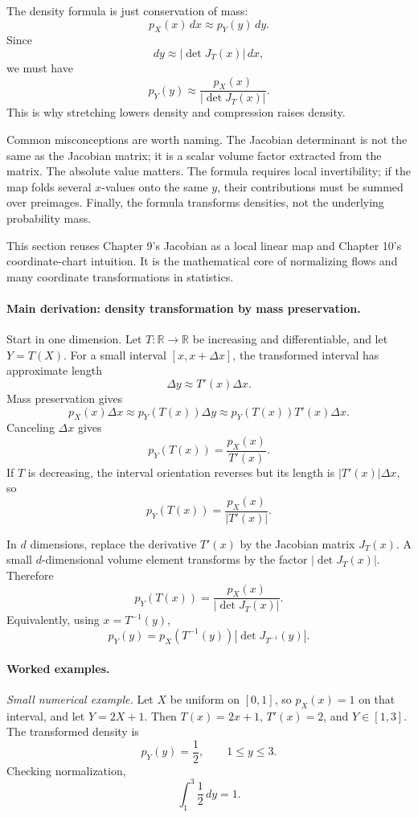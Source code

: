 The density formula is just conservation of mass:
\[
p_X(x)\,dx \approx p_Y(y)\,dy.
\]
Since
\[
dy\approx |\det J_T(x)|\,dx,
\]
we must have
\[
p_Y(y)\approx \frac{p_X(x)}{|\det J_T(x)|}.
\]
This is why stretching lowers density and compression raises density.

Common misconceptions are worth naming. The Jacobian determinant is not the same as the Jacobian matrix; it is a scalar volume factor extracted from the matrix. The absolute value matters. The formula requires local invertibility; if the map folds several \(x\)-values onto the same \(y\), their contributions must be summed over preimages. Finally, the formula transforms densities, not the underlying probability mass.

This section reuses Chapter 9's Jacobian as a local linear map and Chapter 10's coordinate-chart intuition. It is the mathematical core of normalizing flows and many coordinate transformations in statistics.

\paragraph{Main derivation: density transformation by mass preservation.}
Start in one dimension. Let \(T:\mathbb{R}\to\mathbb{R}\) be increasing and differentiable, and let \(Y=T(X)\). For a small interval \([x,x+\Delta x]\), the transformed interval has approximate length
\[
\Delta y\approx T'(x)\Delta x.
\]
Mass preservation gives
\[
p_X(x)\Delta x \approx p_Y(T(x))\Delta y
\approx p_Y(T(x))T'(x)\Delta x.
\]
Canceling \(\Delta x\) gives
\[
p_Y(T(x))=\frac{p_X(x)}{T'(x)}.
\]
If \(T\) is decreasing, the interval orientation reverses but its length is \(|T'(x)|\Delta x\), so
\[
p_Y(T(x))=\frac{p_X(x)}{|T'(x)|}.
\]

In \(d\) dimensions, replace the derivative \(T'(x)\) by the Jacobian matrix \(J_T(x)\). A small \(d\)-dimensional volume element transforms by the factor \(|\det J_T(x)|\). Therefore
\[
p_Y(T(x))=\frac{p_X(x)}{|\det J_T(x)|}.
\]
Equivalently, using \(x=T^{-1}(y)\),
\[
p_Y(y)=p_X(T^{-1}(y))|\det J_{T^{-1}}(y)|.
\]

\paragraph{Worked examples.}
\emph{Small numerical example.} Let \(X\) be uniform on \([0,1]\), so \(p_X(x)=1\) on that interval, and let \(Y=2X+1\). Then \(T(x)=2x+1\), \(T'(x)=2\), and \(Y\in[1,3]\). The transformed density is
\[
p_Y(y)=\frac{1}{2},\qquad 1\leq y\leq3.
\]
Checking normalization,
\[
\int_1^3 \frac{1}{2}\,dy=1.
\]

